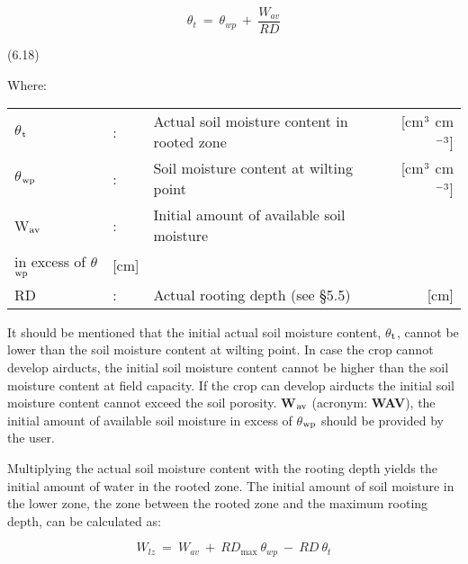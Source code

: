 \begin{equation}
\theta  _{t} ~ =~\theta  _{wp} ~+~{\frac{W _{av} }{RD}}
\end{equation}

 
\strut\hfill (6.18)

Where:\\
\begin{tabularx}{\textwidth}{llXr}



 $\theta$$_{{\rm t}}$ &:& Actual soil moisture content in rooted zone  & [cm$^{{\rm 3}}$ cm$^{{\rm -3}}$]\\
 $\theta$$_{{\rm wp}}$ &:& Soil moisture content at wilting point  & [cm$^{{\rm 3}}$ cm$^{{\rm -3}}$]\\
 W$_{{\rm av}}$ &:& Initial amount of available soil moisture\\
    in excess of $\theta$$_{{\rm wp}}$ & [cm]\\
 RD &:& Actual rooting depth (see \S 5.5) & [cm]
\end{tabularx}



It should be mentioned that the initial actual soil moisture content, $\theta$$_{{\rm t}}$, cannot be lower
than the soil moisture content at wilting point. In case the crop cannot develop airducts,
the initial soil moisture content cannot be higher than the soil moisture content at field
capacity. If the crop can develop airducts the initial soil moisture content cannot exceed
the soil porosity. {\bf W$_{{\rm av}}$} (acronym: {\bf WAV}), the initial amount of available soil moisture in
excess of $\theta$$_{{\rm wp}}$ should be provided by the user. 



Multiplying the actual soil moisture content with the rooting depth yields the initial
amount of water in the rooted zone. The initial amount of soil moisture in the lower zone,
the zone between the rooted zone and the maximum rooting depth, can be calculated as:

\begin{equation}
W  _{lz} ~ =~ W _{av} ~+~ RD _{\max } ~\theta _{wp} ~-~RD~\theta _{t} 
\end{equation}

